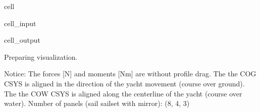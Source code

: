 \documentclass[letterpaper,10pt,english]{jupyterBook}
\begin{document}
\begin{sphinxuseclass}{cell}
\begin{sphinxVerbatimInput}
\begin{sphinxuseclass}{cell_input}
\begin{sphinxVerbatim}[commandchars=\\\{\}]
\end{sphinxVerbatim}

\end{sphinxuseclass}\end{sphinxVerbatimInput}
\begin{sphinxVerbatimOutput}

\begin{sphinxuseclass}{cell_output}
\begin{sphinxVerbatim}[commandchars=\\\{\}]
Preparing visualization.
\end{sphinxVerbatim}

\noindent{}

\begin{sphinxVerbatim}[commandchars=\\\{\}]
\PYGZhy{}\PYGZhy{}\PYGZhy{}\PYGZhy{}\PYGZhy{}\PYGZhy{}\PYGZhy{}\PYGZhy{}\PYGZhy{}\PYGZhy{}\PYGZhy{}\PYGZhy{}\PYGZhy{}\PYGZhy{}\PYGZhy{}\PYGZhy{}\PYGZhy{}\PYGZhy{}\PYGZhy{}\PYGZhy{}\PYGZhy{}\PYGZhy{}\PYGZhy{}\PYGZhy{}\PYGZhy{}\PYGZhy{}\PYGZhy{}\PYGZhy{}\PYGZhy{}\PYGZhy{}\PYGZhy{}\PYGZhy{}\PYGZhy{}\PYGZhy{}\PYGZhy{}\PYGZhy{}\PYGZhy{}\PYGZhy{}\PYGZhy{}\PYGZhy{}\PYGZhy{}\PYGZhy{}\PYGZhy{}\PYGZhy{}\PYGZhy{}\PYGZhy{}\PYGZhy{}\PYGZhy{}\PYGZhy{}\PYGZhy{}\PYGZhy{}\PYGZhy{}\PYGZhy{}\PYGZhy{}\PYGZhy{}\PYGZhy{}\PYGZhy{}\PYGZhy{}\PYGZhy{}\PYGZhy{}\PYGZhy{}
Notice:
	The forces [N] and moments [Nm] are without profile drag.
	The the \PYGZus{}COG\PYGZus{} CSYS is aligned in the direction of the yacht movement (course over ground).
	The the \PYGZus{}COW\PYGZus{} CSYS is aligned along the centerline of the yacht (course over water).
	Number of panels (sail sail\PYGZus{}set with mirror): (8, 4, 3)
\end{sphinxVerbatim}


\end{sphinxuseclass}
\end{sphinxVerbatimOutput}
\end{sphinxuseclass}
\end{document}
